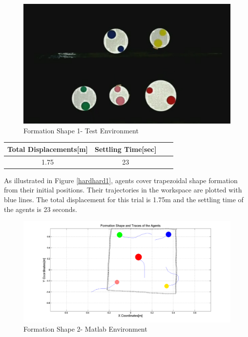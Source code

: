 \begin{figure}[H]
\caption{Formation Shape 1- Test Environment}
\centerline{\includegraphics[scale = 0.35]{2_real_hardware}}
\end{figure} 
					
\begin{center}
 \label{hardwareshape1_ref} 
\begin{tabular}{||c| c |c |c ||}
\hline
Total Displacements[m]  & Settling Time[sec]\\ 
\hline
1.75 & 23 \\
\hline
\end{tabular}
\end{center}

As illustrated in Figure \ref{hardhard1}, agents cover trapezoidal shape formation from their initial positions. Their trajectories in the workspace are plotted with blue lines. The total displacement for this trial is 1.75m and the settling time of the agents is 23 seconds.		
\begin{figure}[H]
\caption{Formation Shape 2- Matlab Environment} \label{hardhard2}
\centerline{\includegraphics[scale = 0.32]{4_hardware}}
\end{figure} 
					
